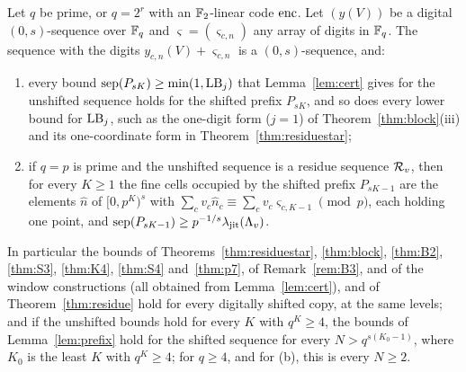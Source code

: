 \begin{lemma}\label{lem:shift}
Let $q$ be prime, or $q=2^r$ with an $\mathbb{F}_2$-linear code $\operatorname{enc}$. Let $(y(V))$ be a digital $(0,s)$-sequence over $\mathbb{F}_q$ and $\varsigma=(\varsigma_{c,n})$ any array of digits in $\mathbb{F}_q$. The sequence with the digits $y_{c,n}(V)+\varsigma_{c,n}$ is a $(0,s)$-sequence, and:
\begin{enumerate}
\item[(a)] every bound $\operatorname{sep}(P_{sK})\ge\min(1,\mathrm{LB}_j)$ that Lemma~\ref{lem:cert} gives for the unshifted sequence holds for the shifted prefix $P_{sK}$, and so does every lower bound for $\mathrm{LB}_j$, such as the one-digit form ($j=1$) of Theorem~\ref{thm:block}(iii) and its one-coordinate form in Theorem~\ref{thm:residuestar};
\item[(b)] if $q=p$ is prime and the unshifted sequence is a residue sequence $\mathcal{R}_v$, then for every $K\ge1$ the fine cells occupied by the shifted prefix $P_{sK-1}$ are the elements $\hat n$ of $[0,p^K)^s$ with $\sum_cv_c\hat n_c\equiv\sum_cv_c\varsigma_{c,K-1}\pmod p$, each holding one point, and $\operatorname{sep}(P_{sK-1})\ge p^{-1/s}\lambda_{\mathrm{jit}}(\Lambda_v)$.
\end{enumerate}
In particular the bounds of Theorems~\ref{thm:residuestar}, \ref{thm:block}, \ref{thm:B2}, \ref{thm:S3}, \ref{thm:K4}, \ref{thm:S4} and~\ref{thm:p7}, of Remark~\ref{rem:B3}, and of the window constructions (all obtained from Lemma~\ref{lem:cert}), and of Theorem~\ref{thm:residue} hold for every digitally shifted copy, at the same levels; and if the unshifted bounds hold for every $K$ with $q^K\ge4$, the bounds of Lemma~\ref{lem:prefix} hold for the shifted sequence for every $N>q^{s(K_0-1)}$, where $K_0$ is the least $K$ with $q^K\ge4$; for $q\ge4$, and for (b), this is every $N\ge2$.
\end{lemma}

